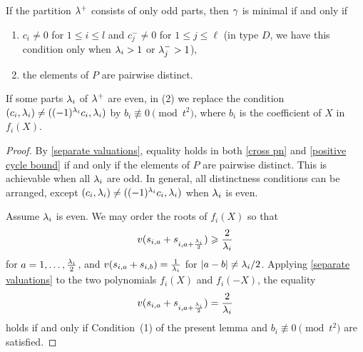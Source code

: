 \documentclass[11pt]{article}
\numberwithin{equation}{section}
\begin{document}
\begin{lem}\label{minimal from type A}    
    If the partition $\lambda^+$ consists of only odd parts, then $\gamma$ is minimal if and only if
    \begin{enumerate}
        \item $c_i\neq 0$ for $1\leqslant i\leqslant l$ and $c_j^{-}\neq 0$ for $1\leqslant j\leqslant \ell$ (in type $D$, we have this condition only when $\lambda_i>1$ or $\lambda^-_j>1$), 
        \item the elements of $P$ are pairwise distinct.
    \end{enumerate}
    
    If some parts $\lambda_i$ of $\lambda^+$ are even, in (2) we replace the condition $(c_i,\lambda_i)\neq((-1)^{\lambda_i}c_i,\lambda_i)$ by $b_i\not\equiv 0 \pmod{t^2}$, where $b_i$ is the coefficient of $X$ in $f_i(X)$.
\end{lem}

\begin{proof}
    By \cref{separate valuations}, equality holds in both \eqref{cross pn} and \eqref{positive cycle bound} if and only if the elements of $P$ are pairwise distinct. This is achievable when all $\lambda_i$ are odd. In general, all distinctness conditions can be arranged, except $(c_i,\lambda_i)\neq((-1)^{\lambda_i}c_i,\lambda_i)$ when $\lambda_i$ is even.
    
    Assume $\lambda_i$ is even. We may order the roots of $f_i(X)$ so that
    \[
    v(s_{i,a}+s_{i,a+\frac{\lambda_i}{2}})\geqslant \frac{2}{\lambda_i}
    \]
    for $a=1,\dots,\frac{\lambda_i}{2}$, and $v(s_{i,a}+s_{i,b})=\frac{1}{\lambda_i}$ for $|a-b|\neq \lambda_i/2$. Applying \cref{separate valuations} to the two polynomials $f_i(X)$ and $f_i(-X)$, the equality
    \[
    v(s_{i,a}+s_{i,a+\frac{\lambda_i}{2}})=\frac{2}{\lambda_i}
    \]
    holds if and only if Condition~(1) of the present lemma and $b_i\not\equiv 0\pmod{t^2}$ are satisfied.
\end{proof}
\end{document}
